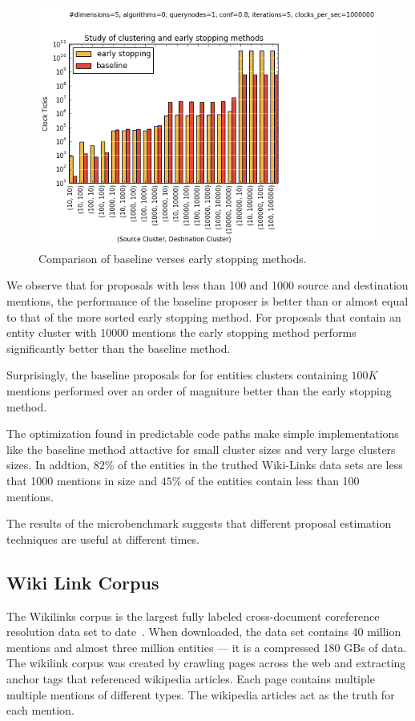 \begin{figure}
\centering
\includegraphics[width=\columnwidth, clip=true,trim=0cm 0cm 0cm 1.2cm]{media/clustering-v-early-stopping.png}
\caption{Comparison of baseline verses early stopping methods.}
\label{fig:clustering-v-early-stopping}
\end{figure}

We observe that for proposals with less than 100 and 1000 source and
destination mentions, the performance of the baseline proposer is better than
or almost equal to that of the more sorted early stopping method.
For proposals that contain an entity cluster with 10000 mentions
the early stopping method performs significantly better than the baseline method.

Surprisingly, the baseline proposals for for entities clusters containing $100 K$ mentions
performed over an order of magniture better than the early stopping method.

The optimization found in predictable code paths make simple implementations
like the baseline method attactive for small cluster sizes and very large clusters sizes.
In addtion, $82\%$ of the entities in the truthed Wiki-Links data sets are less
that 1000 mentions in size and $45\%$ of the entities contain less than 100
mentions.

The results of the microbenchmark suggests that different proposal estimation
techniques are useful at different times.



\subsection{Wiki Link Corpus}

The Wikilinks corpus is the largest fully labeled cross-document coreference resolution data set to date~\cite{singh12:wiki-links}.
When downloaded, the data set contains 40 million mentions and almost three million entities --- it is a compressed 180 GBs of data.
The wikilink corpus was created by crawling pages across the web and extracting anchor tags that referenced wikipedia articles.
Each page contains multiple multiple mentions of different types.
The wikipedia articles act as the truth for each mention.


